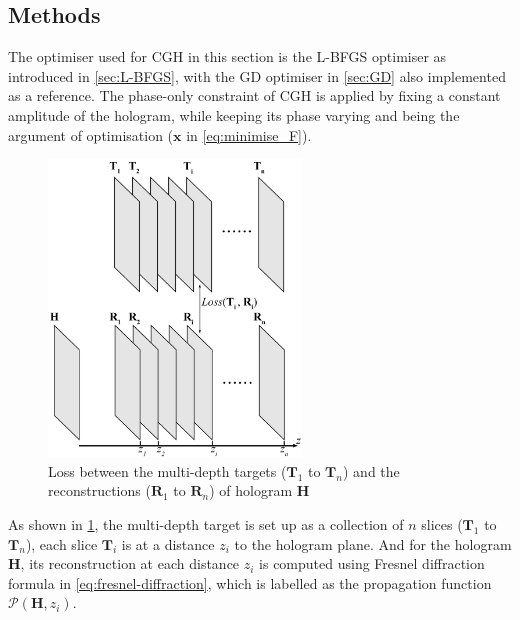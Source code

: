 \subsection{Methods}

The optimiser used for CGH in this section is the L-BFGS optimiser as introduced in \cref{sec:L-BFGS}, with the GD optimiser in \cref{sec:GD} also implemented as a reference. The phase-only constraint of CGH is applied by fixing a constant amplitude of the hologram, while keeping its phase varying and being the argument of optimisation ($\textbf{x}$ in \cref{eq:minimise_F}).

\begin{figure}[H]
	\centering
	\includegraphics[width=0.6\textwidth]{Fresnel_slice_illustration}
	\caption{Loss between the multi-depth targets ($\textbf{T}_1$ to $\textbf{T}_n$) and the reconstructions ($\textbf{R}_1$ to $\textbf{R}_n$) of hologram $\textbf{H}$}
	\label{fig:Fresnel_slice_illustration}
\end{figure}

As shown in \cref{fig:Fresnel_slice_illustration}, the multi-depth target is set up as a collection of $n$ slices ($\textbf{T}_1$ to $\textbf{T}_n$), each slice $\textbf{T}_i$ is at a distance $z_i$ to the hologram plane. And for the hologram $\textbf{H}$, its reconstruction at each distance $z_i$ is computed using Fresnel diffraction formula in \cref{eq:fresnel-diffraction}, which is labelled as the propagation function $\mathcal{P}(\textbf{H}, z_i)$.

